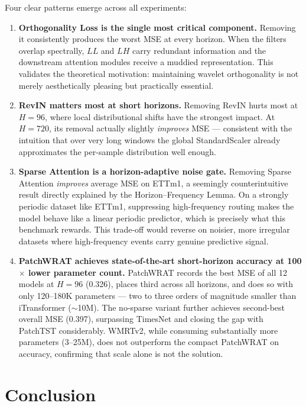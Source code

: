 \documentclass[11pt, letterpaper]{article}
\begin{document}
Four clear patterns emerge across all experiments:

\begin{enumerate}
  \item \textbf{Orthogonality Loss is the single most critical component.} Removing it consistently produces the worst MSE at every horizon. When the filters overlap spectrally, $LL$ and $LH$ carry redundant information and the downstream attention modules receive a muddied representation. This validates the theoretical motivation: maintaining wavelet orthogonality is not merely aesthetically pleasing but practically essential.

  \item \textbf{RevIN matters most at short horizons.} Removing RevIN hurts most at $H=96$, where local distributional shifts have the strongest impact. At $H=720$, its removal actually slightly \emph{improves} MSE --- consistent with the intuition that over very long windows the global StandardScaler already approximates the per-sample distribution well enough.

  \item \textbf{Sparse Attention is a horizon-adaptive noise gate.} Removing Sparse Attention \emph{improves} average MSE on ETTm1, a seemingly counterintuitive result directly explained by the Horizon--Frequency Lemma. On a strongly periodic dataset like ETTm1, suppressing high-frequency routing makes the model behave like a linear periodic predictor, which is precisely what this benchmark rewards. This trade-off would reverse on noisier, more irregular datasets where high-frequency events carry genuine predictive signal.

  \item \textbf{PatchWRAT achieves state-of-the-art short-horizon accuracy at 100$\times$ lower parameter count.} PatchWRAT records the best MSE of all 12 models at $H=96$ (0.326), places third across all horizons, and does so with only 120--180K parameters --- two to three orders of magnitude smaller than iTransformer ($\sim$10M). The no-sparse variant further achieves second-best overall MSE (0.397), surpassing TimesNet and closing the gap with PatchTST considerably. WMRTv2, while consuming substantially more parameters (3--25M), does not outperform the compact PatchWRAT on accuracy, confirming that scale alone is not the solution.
\end{enumerate}

\section{Conclusion}
\end{document}
